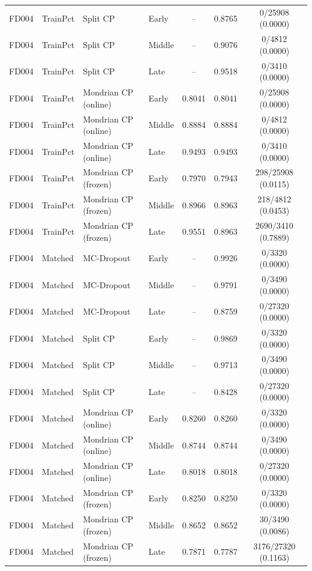 \begin{table}[t]
\begin{tabular}{llllccc}
FD004 & TrainPct & Split CP & Early & -- & 0.8765 & 0/25908 (0.0000) \\
FD004 & TrainPct & Split CP & Middle & -- & 0.9076 & 0/4812 (0.0000) \\
FD004 & TrainPct & Split CP & Late & -- & 0.9518 & 0/3410 (0.0000) \\
FD004 & TrainPct & Mondrian CP (online) & Early & 0.8041 & 0.8041 & 0/25908 (0.0000) \\
FD004 & TrainPct & Mondrian CP (online) & Middle & 0.8884 & 0.8884 & 0/4812 (0.0000) \\
FD004 & TrainPct & Mondrian CP (online) & Late & 0.9493 & 0.9493 & 0/3410 (0.0000) \\
FD004 & TrainPct & Mondrian CP (frozen) & Early & 0.7970 & 0.7943 & 298/25908 (0.0115) \\
FD004 & TrainPct & Mondrian CP (frozen) & Middle & 0.8966 & 0.8963 & 218/4812 (0.0453) \\
FD004 & TrainPct & Mondrian CP (frozen) & Late & 0.9551 & 0.8963 & 2690/3410 (0.7889) \\
FD004 & Matched & MC-Dropout & Early & -- & 0.9926 & 0/3320 (0.0000) \\
FD004 & Matched & MC-Dropout & Middle & -- & 0.9791 & 0/3490 (0.0000) \\
FD004 & Matched & MC-Dropout & Late & -- & 0.8759 & 0/27320 (0.0000) \\
FD004 & Matched & Split CP & Early & -- & 0.9869 & 0/3320 (0.0000) \\
FD004 & Matched & Split CP & Middle & -- & 0.9713 & 0/3490 (0.0000) \\
FD004 & Matched & Split CP & Late & -- & 0.8428 & 0/27320 (0.0000) \\
FD004 & Matched & Mondrian CP (online) & Early & 0.8260 & 0.8260 & 0/3320 (0.0000) \\
FD004 & Matched & Mondrian CP (online) & Middle & 0.8744 & 0.8744 & 0/3490 (0.0000) \\
FD004 & Matched & Mondrian CP (online) & Late & 0.8018 & 0.8018 & 0/27320 (0.0000) \\
FD004 & Matched & Mondrian CP (frozen) & Early & 0.8250 & 0.8250 & 0/3320 (0.0000) \\
FD004 & Matched & Mondrian CP (frozen) & Middle & 0.8652 & 0.8652 & 30/3490 (0.0086) \\
FD004 & Matched & Mondrian CP (frozen) & Late & 0.7871 & 0.7787 & 3176/27320 (0.1163) \\
\bottomrule
\end{tabular}
\end{table}
